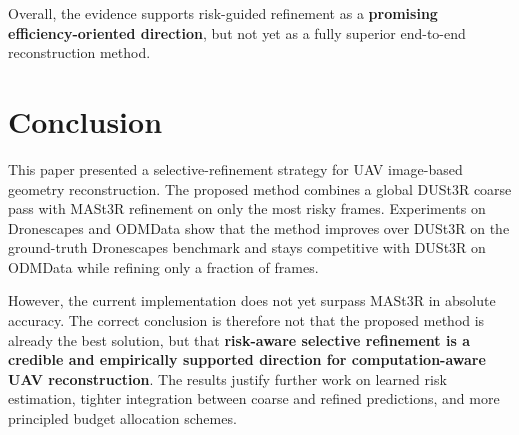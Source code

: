 \documentclass[preprint,12pt]{elsarticle}
\begin{document}
Overall, the evidence supports risk-guided refinement as a \textbf{promising efficiency-oriented direction}, but not yet as a fully superior end-to-end reconstruction method.

\section{Conclusion}

This paper presented a selective-refinement strategy for UAV image-based geometry reconstruction. The proposed method combines a global DUSt3R coarse pass with MASt3R refinement on only the most risky frames. Experiments on Dronescapes and ODMData show that the method improves over DUSt3R on the ground-truth Dronescapes benchmark and stays competitive with DUSt3R on ODMData while refining only a fraction of frames.

However, the current implementation does not yet surpass MASt3R in absolute accuracy. The correct conclusion is therefore not that the proposed method is already the best solution, but that \textbf{risk-aware selective refinement is a credible and empirically supported direction for computation-aware UAV reconstruction}. The results justify further work on learned risk estimation, tighter integration between coarse and refined predictions, and more principled budget allocation schemes.



\end{document}

